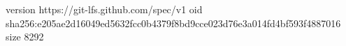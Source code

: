 version https://git-lfs.github.com/spec/v1
oid sha256:e205ae2d16049ed5632fcc0b4379f8bd9cce023d76e3a014fd4bf593f4887016
size 8292
